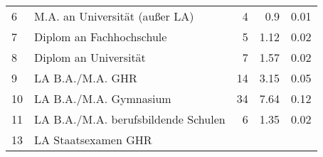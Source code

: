 \begin{longtable}{lXrrr}
     6 &
     \multicolumn{1}{X}{ M.A. an Universität (außer LA)   } &


       \num{4} &
       \num[round-mode=places,round-precision=2]{0,9} &
         \num[round-mode=places,round-precision=2]{0,01} \\

     7 &
     \multicolumn{1}{X}{ Diplom an Fachhochschule   } &


       \num{5} &
       \num[round-mode=places,round-precision=2]{1,12} &
         \num[round-mode=places,round-precision=2]{0,02} \\

     8 &
     \multicolumn{1}{X}{ Diplom an Universität   } &


       \num{7} &
       \num[round-mode=places,round-precision=2]{1,57} &
         \num[round-mode=places,round-precision=2]{0,02} \\

     9 &
     \multicolumn{1}{X}{ LA B.A./M.A. GHR   } &


       \num{14} &
       \num[round-mode=places,round-precision=2]{3,15} &
         \num[round-mode=places,round-precision=2]{0,05} \\

     10 &
     \multicolumn{1}{X}{ LA B.A./M.A. Gymnasium   } &


       \num{34} &
       \num[round-mode=places,round-precision=2]{7,64} &
         \num[round-mode=places,round-precision=2]{0,12} \\

     11 &
     \multicolumn{1}{X}{ LA B.A./M.A. berufsbildende Schulen   } &


       \num{6} &
       \num[round-mode=places,round-precision=2]{1,35} &
         \num[round-mode=places,round-precision=2]{0,02} \\

     13 &
     \multicolumn{1}{X}{ LA Staatsexamen GHR   } &



\end{longtable}
